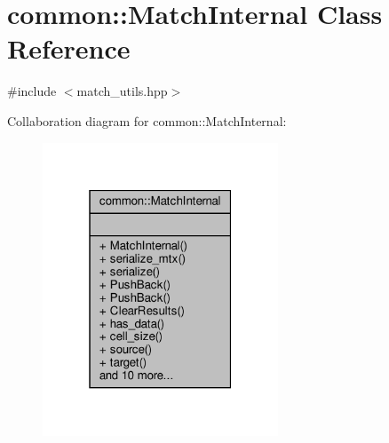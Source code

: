 \hypertarget{classcommon_1_1MatchInternal}{}\section{common\+:\+:Match\+Internal Class Reference}
\label{classcommon_1_1MatchInternal}


{\ttfamily \#include $<$match\+\_\+utils.\+hpp$>$}



Collaboration diagram for common\+:\+:Match\+Internal\+:\nopagebreak
\begin{figure}[H]
\begin{center}
\leavevmode
\includegraphics[width=199pt]{d7/dfe/classcommon_1_1MatchInternal__coll__graph}
\end{center}
\end{figure}

